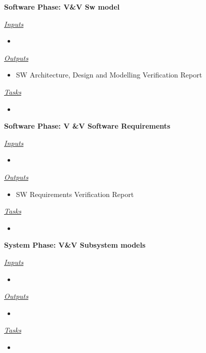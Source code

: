 \documentclass{template/openetcs_article}
\begin{document}
\begin{description}
\item \textbf{Software Phase: V\&V Sw model}

\underline{\textit{Inputs}}
\begin{itemize}
\item 
\end{itemize}

\underline{\textit{Outputs}}
\begin{itemize}
\item SW Architecture, Design and Modelling Verification Report
\end{itemize}

\underline{\textit{Tasks}}
\begin{itemize}
\item 
\end{itemize}
\end{description}

\begin{description}
\item \textbf{Software Phase: V \&V Software Requirements}

\underline{\textit{Inputs}}
\begin{itemize}
\item 
\end{itemize}

\underline{\textit{Outputs}}
\begin{itemize}
\item SW Requirements Verification Report
\end{itemize}

\underline{\textit{Tasks}}
\begin{itemize}
\item 
\end{itemize}
\end{description}

\begin{description}
\item \textbf{System Phase: V\&V Subsystem models}

\underline{\textit{Inputs}}
\begin{itemize}
\item 
\end{itemize}

\underline{\textit{Outputs}}
\begin{itemize}
\item 
\end{itemize}

\underline{\textit{Tasks}}
\begin{itemize}
\item 
\end{itemize}
\end{description}
\end{document}
